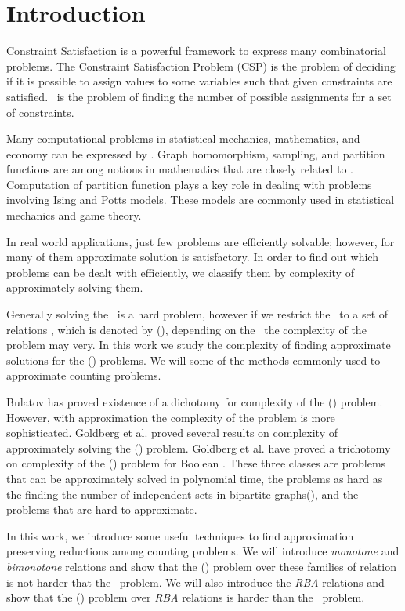 \chapter{Introduction}
Constraint Satisfaction is a powerful framework to express many combinatorial problems.
The Constraint Satisfaction Problem (CSP) is the problem of deciding if it is possible to
assign values to some variables such that given constraints are satisfied. \ccsp\ 
is the problem of finding the number of possible assignments for a set of constraints.

Many computational problems in statistical mechanics, mathematics, and economy
can be expressed by \ccsp\@. Graph homomorphism, sampling,
and partition functions are among notions in mathematics
that are closely related to \ccsp\@. Computation of partition function plays a key role
in dealing with problems involving Ising and Potts models. These models are
commonly used in statistical mechanics and game theory.
 
In real world applications, just few problems are efficiently solvable;
however, for many of them approximate solution is satisfactory. 
In order to find out which problems can be dealt with efficiently, we classify them
by complexity of approximately solving them.

Generally solving the \ccsp\ is a hard problem, however if we restrict the
\ccsp\ to a set of relations \mrelset, which is denoted by \ccsp(\mrelset),
depending on the \mrelset\ the complexity of the problem may very.
In this work we study the complexity of finding approximate solutions for the \ccsp(\mrelset) problems.
We will some of the methods commonly used to approximate counting problems.

Bulatov \cite{Bulatov} has proved existence of a dichotomy for complexity of the
\ccsp(\mrelset) problem. However, with approximation the complexity of the problem is
more sophisticated. Goldberg et al. \cite{Leslie03} proved
several results on complexity of approximately solving the \ccsp(\mrelset) problem.
Goldberg et al. \cite{Trichotomy} have proved a trichotomy on complexity
of the \ccsp(\mrelset) problem for Boolean \mrelset\@. These three classes are
problems that can be approximately solved in polynomial time, the problems as hard as the 
finding the number of independent sets in bipartite graphs(\cbis), and the
problems that are hard to approximate.

In this work, we introduce some useful techniques to find approximation preserving reductions
among counting problems. We will introduce \emph{monotone} and \emph{bimonotone} relations
and show that the \ccsp(\mrelset) problem over these families of relation is not harder that
the \cbis\ problem. We will also introduce the \emph{RBA} relations and
show that the \ccsp(\mrelset) problem over \emph{RBA} relations is harder than the \cbis\ problem.

